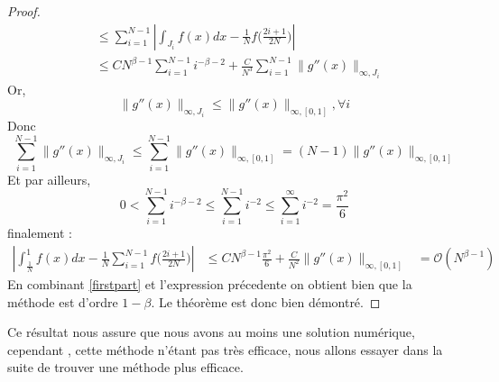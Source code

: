 \documentclass[a4paper,10pt]{article}
\begin{document}
\begin{proof}
\begin{equation}
\begin{align}
									     &\leq  \sum_{i=1}^{N-1}|\int_{J_i} f(x)dx - \frac{1}{N}f\Big(\frac{2i + 1}{2N}\Big)|\\
									     &\leq C N^{\beta - 1} \sum_{i=1}^{N-1}i^{-\beta - 2} + \frac{C}{N^3}\sum_{i=1}^{N-1} \|g''(x)  \|_{\infty, J_i}
 \end{align}
\end{equation}
Or,
\begin{equation}
 \|g''(x)  \|_{\infty, J_i} \leq \|g''(x)  \|_{\infty, [0,1]}, \forall i
\end{equation}
Donc
\begin{equation}
 \sum_{i=1}^{N-1}\|g''(x)  \|_{\infty, J_i} \leq \sum_{i=1}^{N-1}\|g''(x)  \|_{\infty, [0,1]} = (N-1)\|g''(x)  \|_{\infty, [0,1]} 
\end{equation}
Et par ailleurs,
\begin{equation}
 0 < \sum_{i=1}^{N-1}i^{-\beta - 2} \leq \sum_{i=1}^{N-1}i^{- 2} \leq \sum_{i=1}^{\infty}i^{- 2} = \frac{\pi ^2}{6}  
\end{equation}
finalement :
\begin{equation}
\begin{align}
 |\int_\frac{1}{N}^1f(x)dx - \frac{1}{N}\sum_{i=1}^{N-1}f\Big(\frac{2i + 1}{2N}\Big)| &\leq C N^{\beta - 1} \frac{\pi ^2}{6}  + \frac{C}{N^2}\|g''(x)  \|_{\infty, [0,1]} 
									     &= \mathcal{O}(N^{\beta - 1}) 
\end{align}
\end{equation}
 En combinant \ref{firstpart} et l'expression pr\'ecedente on obtient bien que la m\'ethode est d'ordre $1- \beta$. Le th\'eor\`eme est donc bien d\'emontr\'e.
\end{proof}
Ce r\'esultat nous assure que nous avons au moins une solution num\'erique, cependant , cette m\'ethode n'\'etant pas tr\`es efficace, nous allons essayer dans la suite de trouver une m\'ethode plus efficace.
\end{document}
